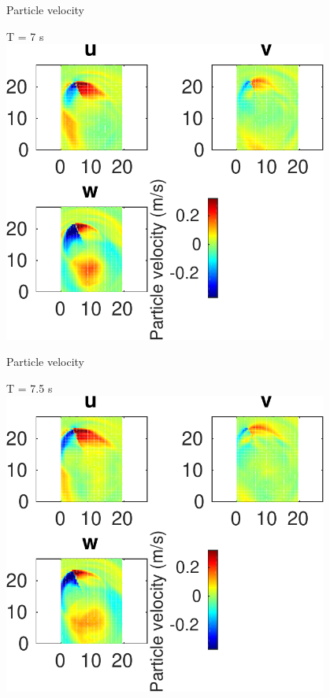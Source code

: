 \documentclass{beamer}
\begin{document}
\begin{frame}
 {Particle velocity}
 
 \centering \Large T = 7 s\\
 \includegraphics[width=0.8\textwidth]{images/horizontal_velo_00076}
 
\end{frame}

\begin{frame}
 {Particle velocity}
 
 \centering \Large T = 7.5 s\\
 \includegraphics[width=0.8\textwidth]{images/horizontal_velo_00081}
 
\end{frame}
\end{document}
